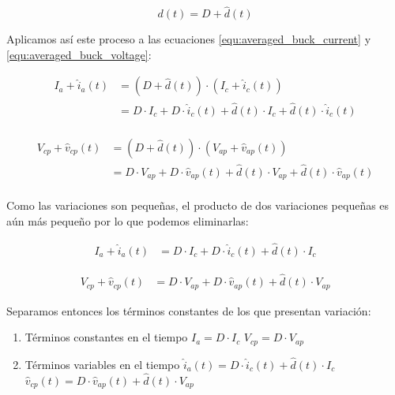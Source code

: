 \documentclass[12pt]{report}
\begin{document}
	\begin{equation}
		d(t) = D + \hat{d}(t)
	\end{equation}
	
	Aplicamos así este proceso a las ecuaciones \ref{equ:averaged_buck_current} y \ref{equ:averaged_buck_voltage}:
	
	\begin{equation}
	\begin{aligned}
	I_a + \hat{i}_a(t) &= (D + \hat{d}(t)) \cdot (I_c + \hat{i}_c(t)) \\
		 &= D \cdot I_c + D \cdot \hat{i}_c(t) + \hat{d}(t) \cdot I_c + \hat{d}(t) \cdot \hat{i}_c(t) \\
	\end{aligned}
	\end{equation}
	
	\begin{equation}
	\begin{aligned}
	V_{cp} + \hat{v}_{cp}(t) &= (D + \hat{d}(t)) \cdot (V_{ap} + \hat{v}_{ap}(t)) \\
	&= D \cdot V_{ap} + D \cdot \hat{v}_{ap}(t) + \hat{d}(t) \cdot V_{ap} + \hat{d}(t) \cdot \hat{v}_{ap}(t) \\
	\end{aligned}
	\end{equation}
	
	Como las variaciones son pequeñas, el producto de dos variaciones pequeñas es aún más pequeño por lo que podemos eliminarlas:
	
	\begin{equation}
	\begin{aligned}
	I_a + \hat{i}_a(t) &= D \cdot I_c + D \cdot \hat{i}_c(t) + \hat{d}(t) \cdot I_c
	\end{aligned}
	\end{equation}
	
	\begin{equation}
	\begin{aligned}
	V_{cp} + \hat{v}_{cp}(t) &= D \cdot V_{ap} + D \cdot \hat{v}_{ap}(t) + \hat{d}(t) \cdot V_{ap}
	\end{aligned}
	\end{equation}
	
	Separamos entonces los términos constantes de los que presentan variación:
	
	\begin{enumerate}
		\item Términos constantes en el tiempo
			\subitem $I_a = D \cdot I_c$
			\subitem $V_{cp} = D \cdot V_{ap}$
		\item Términos variables en el tiempo
			\subitem $\hat{i}_a(t) = D \cdot \hat{i}_c(t) + \hat{d}(t) \cdot I_c$
			\subitem $\hat{v}_{cp}(t) = D \cdot \hat{v}_{ap}(t) + \hat{d}(t) \cdot V_{ap}$
	\end{enumerate}
\end{document}
